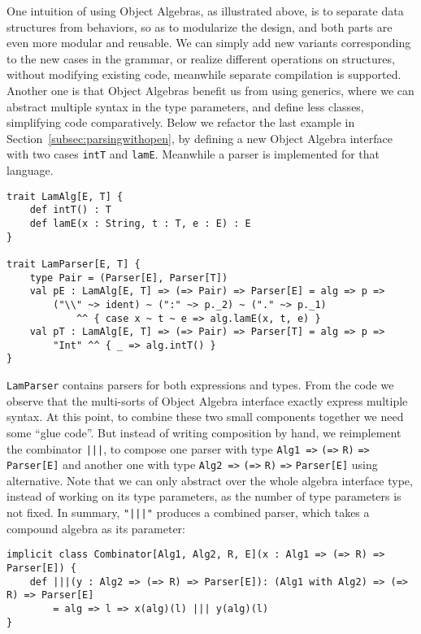 One intuition of using Object Algebras, as illustrated above, is to separate data structures from behaviors, so as to modularize the design, and both parts are even more modular and reusable. We can simply add new variants corresponding to the new cases in the grammar, or realize different operations on structures, without modifying existing code, meanwhile separate compilation is supported. Another one is that Object Algebras benefit us from using generics, where we can abstract multiple syntax in the type parameters, and define less classes, simplifying code comparatively. Below we refactor the last example in Section~\ref{subsec:parsingwithopen}, by defining a new Object Algebra interface with two cases \lstinline{intT} and \lstinline{lamE}. Meanwhile a parser is implemented for that language.
\begin{lstlisting}
trait LamAlg[E, T] {
    def intT() : T
    def lamE(x : String, t : T, e : E) : E
}

trait LamParser[E, T] {
    type Pair = (Parser[E], Parser[T])
    val pE : LamAlg[E, T] => (=> Pair) => Parser[E] = alg => p =>
        ("\\" ~> ident) ~ (":" ~> p._2) ~ ("." ~> p._1)
            ^^ { case x ~ t ~ e => alg.lamE(x, t, e) }
    val pT : LamAlg[E, T] => (=> Pair) => Parser[T] = alg => p =>
        "Int" ^^ { _ => alg.intT() }
}
\end{lstlisting}
\lstinline{LamParser} contains parsers for both expressions and types. From the code we observe that the multi-sorts of Object Algebra interface
exactly express multiple syntax. At this point, to combine these two small components together we need some ``glue code''. But instead of writing composition by hand, we reimplement the combinator \lstinline{|||}, to compose one parser with type \lstinline{Alg1 =>} \lstinline{(=>} \lstinline{R)} \lstinline{=>} \lstinline{Parser[E]} and another one with type \lstinline{Alg2 =>} \lstinline{(=>} \lstinline{R)} \lstinline{=>} \lstinline{Parser[E]} using alternative. Note that we can only abstract over the whole algebra interface type, instead of working on its type parameters, as the number of type parameters is not fixed. In summary, \lstinline{"|||"} produces a combined parser, which takes a compound algebra as its parameter:
\begin{lstlisting}
implicit class Combinator[Alg1, Alg2, R, E](x : Alg1 => (=> R) => Parser[E]) {
    def |||(y : Alg2 => (=> R) => Parser[E]): (Alg1 with Alg2) => (=> R) => Parser[E]
        = alg => l => x(alg)(l) ||| y(alg)(l)
}
\end{lstlisting}
